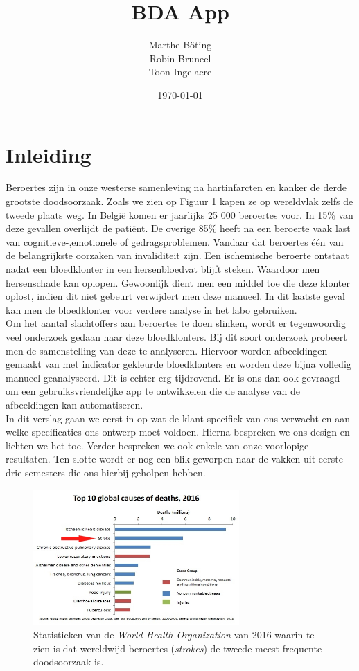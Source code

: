 \documentclass[a4paper,kulak]{kulakarticle}
\date{\today}
\title{BDA App}
\author{Marthe B\"{o}ting\\
	Robin Bruneel\\
	Toon Ingelaere}
\begin{document}
	
	\newpage
	
	\maketitle
	\section*{Inleiding}
		Beroertes zijn in onze westerse samenleving na hartinfarcten en kanker de derde grootste doodsoorzaak. Zoals we zien op Figuur \ref{figuur doodsoorzaken} kapen ze op wereldvlak zelfs de tweede plaats weg\cite{worldhealthorganization}. In België komen er jaarlijks 25 000 beroertes voor. In 15\% van deze gevallen overlijdt de patiënt. De overige 85\% heeft na een beroerte vaak last van cognitieve-,emotionele of gedragsproblemen. Vandaar dat beroertes één van de belangrijkste oorzaken van invaliditeit zijn. Een ischemische beroerte ontstaat nadat een bloedklonter in een hersenbloedvat blijft steken. Waardoor men hersenschade kan oplopen.
		Gewoonlijk dient men een middel toe die deze klonter oplost, indien dit niet gebeurt verwijdert men deze manueel. In dit laatste geval kan men de bloedklonter voor verdere analyse in het labo gebruiken.\\
		Om het aantal slachtoffers aan beroertes te doen slinken, wordt er tegenwoordig veel onderzoek gedaan naar deze bloedklonters. Bij dit soort onderzoek probeert men de samenstelling van deze te analyseren. Hiervoor worden afbeeldingen gemaakt van met indicator gekleurde bloedklonters en worden deze bijna volledig manueel geanalyseerd. Dit is echter erg tijdrovend. Er is ons dan ook gevraagd om een gebruiksvriendelijke app te ontwikkelen die de analyse van de afbeeldingen kan automatiseren.\\
		In dit verslag gaan we eerst in op wat de klant specifiek van ons verwacht en aan welke specificaties ons ontwerp moet voldoen. Hierna bespreken we ons design en lichten we het toe. Verder bespreken we ook enkele van onze voorlopige resultaten. Ten slotte wordt er nog een blik geworpen naar de vakken uit eerste drie semesters die ons hierbij geholpen hebben.

		\begin{figure}[H]
			\centering
			\includegraphics[width = 0.7\textwidth]{top10doodsoorzaken.png}
			
			\caption{Statistieken van de \textit{World Health Organization} van 2016 waarin te zien is dat wereldwijd beroertes (\textit{strokes}) de tweede meest frequente doodsoorzaak is.}
			\label{figuur doodsoorzaken}
		\end{figure}
	\newpage
		
\end{document}
